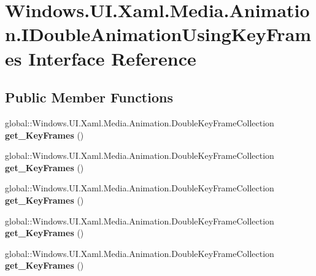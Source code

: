 \hypertarget{interface_windows_1_1_u_i_1_1_xaml_1_1_media_1_1_animation_1_1_i_double_animation_using_key_frames}{}\section{Windows.\+U\+I.\+Xaml.\+Media.\+Animation.\+I\+Double\+Animation\+Using\+Key\+Frames Interface Reference}
\label{interface_windows_1_1_u_i_1_1_xaml_1_1_media_1_1_animation_1_1_i_double_animation_using_key_frames}
\subsection*{Public Member Functions}
\begin{DoxyCompactItemize}
\item 
\mbox{\label{interface_windows_1_1_u_i_1_1_xaml_1_1_media_1_1_animation_1_1_i_double_animation_using_key_frames_aadb3918bce241b85649748379af6ab11}} 
global\+::\+Windows.\+U\+I.\+Xaml.\+Media.\+Animation.\+Double\+Key\+Frame\+Collection {\bfseries get\+\_\+\+Key\+Frames} ()
\item 
\mbox{\label{interface_windows_1_1_u_i_1_1_xaml_1_1_media_1_1_animation_1_1_i_double_animation_using_key_frames_aadb3918bce241b85649748379af6ab11}} 
global\+::\+Windows.\+U\+I.\+Xaml.\+Media.\+Animation.\+Double\+Key\+Frame\+Collection {\bfseries get\+\_\+\+Key\+Frames} ()
\item 
\mbox{\label{interface_windows_1_1_u_i_1_1_xaml_1_1_media_1_1_animation_1_1_i_double_animation_using_key_frames_aadb3918bce241b85649748379af6ab11}} 
global\+::\+Windows.\+U\+I.\+Xaml.\+Media.\+Animation.\+Double\+Key\+Frame\+Collection {\bfseries get\+\_\+\+Key\+Frames} ()
\item 
\mbox{\label{interface_windows_1_1_u_i_1_1_xaml_1_1_media_1_1_animation_1_1_i_double_animation_using_key_frames_aadb3918bce241b85649748379af6ab11}} 
global\+::\+Windows.\+U\+I.\+Xaml.\+Media.\+Animation.\+Double\+Key\+Frame\+Collection {\bfseries get\+\_\+\+Key\+Frames} ()
\item 
\mbox{\label{interface_windows_1_1_u_i_1_1_xaml_1_1_media_1_1_animation_1_1_i_double_animation_using_key_frames_aadb3918bce241b85649748379af6ab11}} 
global\+::\+Windows.\+U\+I.\+Xaml.\+Media.\+Animation.\+Double\+Key\+Frame\+Collection {\bfseries get\+\_\+\+Key\+Frames} ()
\end{DoxyCompactItemize}


